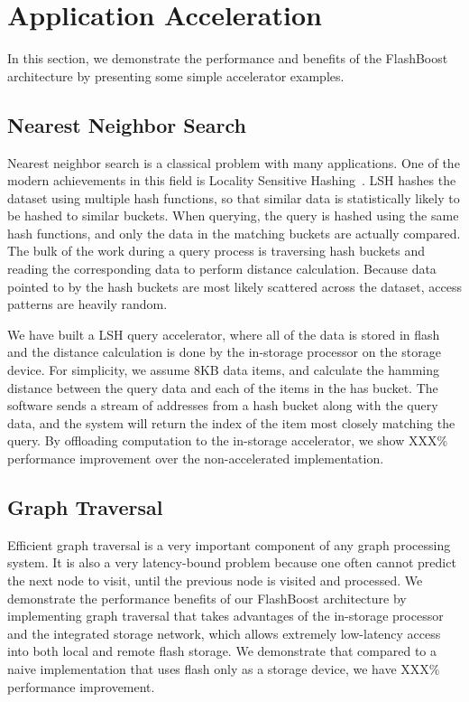\section{Application Acceleration}
\label{sec:acceleration}

In this section, we demonstrate the performance and benefits of the FlashBoost
architecture by presenting some simple accelerator examples. 

\subsection{Nearest Neighbor Search}

Nearest neighbor search is a classical problem with many applications. One of
the modern achievements in this field is Locality Sensitive Hashing~\cite{lsh}.
LSH hashes the dataset using multiple hash functions, so that
similar data is statistically likely to be hashed to similar buckets. When
querying, the query is hashed using the same hash functions, and only the data
in the matching buckets are actually compared. The bulk of the work during a
query process is traversing hash buckets and reading the corresponding data to
perform distance calculation. Because data pointed to by the hash buckets are
most likely scattered across the dataset, access patterns are heavily random.

We have built a LSH query accelerator, where all of the data is stored in flash
and the distance calculation is done by the in-storage processor on the storage
device. For simplicity, we assume 8KB data items, and calculate the hamming
distance between the query data and each of the items in the has bucket. The
software sends a stream of addresses from a hash bucket along with the query
data, and the system will return the index of the item most closely matching the
query. By offloading computation to the in-storage accelerator, we
show XXX\% performance improvement over the non-accelerated implementation.



\subsection{Graph Traversal}

Efficient graph traversal is a very important component of any graph processing
system. It is also a very latency-bound problem because one often cannot predict
the next node to visit, until the previous node is visited and processed. We
demonstrate the performance benefits of our FlashBoost architecture by
implementing graph traversal that takes advantages of the in-storage processor
and the integrated storage network, which allows extremely low-latency access
into both local and remote flash storage. We demonstrate that compared to a
naive implementation that uses flash only as a storage device, we have XXX\%
performance improvement.

